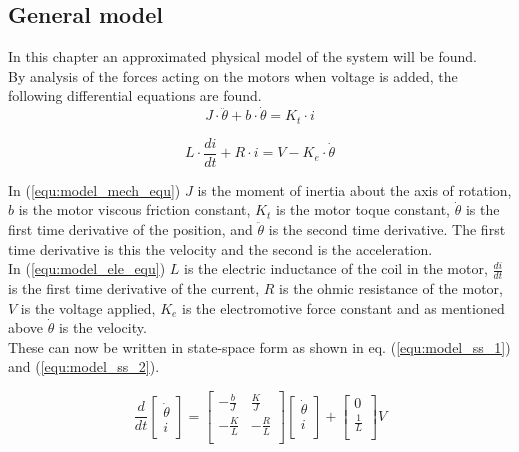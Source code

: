 \documentclass[../../main]{subfiles}
\begin{document}
\subsection{General model}
\label{sec:General_model}

In this chapter an approximated physical model of the system will be found.\\

By analysis of the forces acting on the motors when voltage is added, the following differential equations are found.\\

\begin{equation}
  \label{equ:model_mech_equ}
  J\cdot \ddot \theta + b\cdot \dot \theta = K_t\cdot i
\end{equation}

\begin{equation}
  \label{equ:model_ele_equ}
  L\cdot \frac{di}{dt} + R\cdot i = V - K_e\cdot \dot \theta
\end{equation}

In (\ref{equ:model_mech_equ}) $J$ is the moment of inertia about the axis of rotation, $b$ is the motor viscous friction constant, $K_t$ is the motor toque constant, $\dot \theta$ is the first time derivative of the position, and $\ddot \theta$ is the second time derivative. The first time derivative is this the velocity and the second is the acceleration.\\
In (\ref{equ:model_ele_equ}) $L$ is the electric inductance of the coil in the motor, $\frac{di}{dt}$ is the first time derivative of the current, $R$ is the ohmic resistance of the motor, $V$ is the voltage applied, $K_e$ is the electromotive force constant and as mentioned above $\dot \theta$ is the velocity.\\
These can now be written in state-space form as shown in eq. (\ref{equ:model_ss_1}) and (\ref{equ:model_ss_2}).

\begin{equation}
      \label{equ:model_ss_1}
      \frac{d}{dt}
    \begin{bmatrix}
        \dot \theta \\
        i
    \end{bmatrix}
    =
    \begin{bmatrix}
        -\frac{b}{J} & \frac{K}{J}\\
        -\frac{K}{L} & -\frac{R}{L}\\
    \end{bmatrix}
    \begin{bmatrix}
        \dot \theta \\
        i \\
    \end{bmatrix}
    +
    \begin{bmatrix}
        0 \\
        \frac{1}{L} \\
    \end{bmatrix}
    V
\end{equation}
\end{document}
